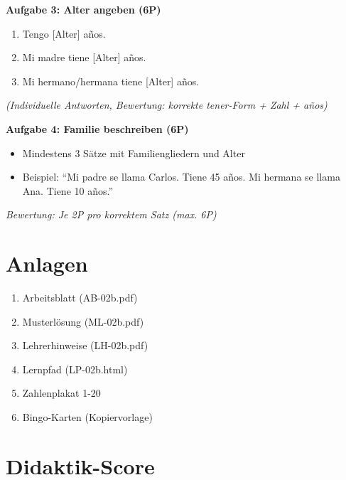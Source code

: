 \documentclass[11pt,a4paper]{article}
\begin{document}
\textbf{Aufgabe 3: Alter angeben (6P)}
\begin{enumerate}[label=\alph*)]
    \item Tengo [Alter] años.
    \item Mi madre tiene [Alter] años.
    \item Mi hermano/hermana tiene [Alter] años.
\end{enumerate}
\textit{(Individuelle Antworten, Bewertung: korrekte tener-Form + Zahl + años)}

\textbf{Aufgabe 4: Familie beschreiben (6P)}
\begin{itemize}
    \item Mindestens 3 Sätze mit Familiengliedern und Alter
    \item Beispiel: ``Mi padre se llama Carlos. Tiene 45 años. Mi hermana se llama Ana. Tiene 10 años.''
\end{itemize}
\textit{Bewertung: Je 2P pro korrektem Satz (max. 6P)}

\section{Anlagen}

\begin{enumerate}
    \item Arbeitsblatt (AB-02b.pdf)
    \item Musterlösung (ML-02b.pdf)
    \item Lehrerhinweise (LH-02b.pdf)
    \item Lernpfad (LP-02b.html)
    \item Zahlenplakat 1-20
    \item Bingo-Karten (Kopiervorlage)
\end{enumerate}

\newpage
\section{Didaktik-Score}
\end{document}
